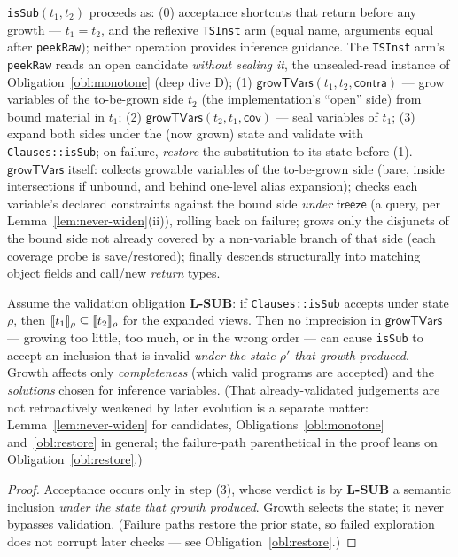 \documentclass[11pt]{article}
\begin{document}
\begin{definition}
\label{def:issub-arch}
\texttt{isSub}$(t_1, t_2)$ proceeds as:
(0) acceptance shortcuts that return before any growth --- $t_1 = t_2$, and
the reflexive \texttt{TSInst} arm (equal name, arguments equal after
\texttt{peekRaw}); neither operation provides inference guidance. The \texttt{TSInst} arm's
\texttt{peekRaw} reads an open candidate \emph{without sealing it},
the unsealed-read instance of
Obligation~\ref{obl:monotone} (deep dive D);
(1) $\mathsf{growTVars}(t_1, t_2, \mathsf{contra})$ — grow variables of the
to-be-grown side $t_2$ (the implementation's ``open'' side) from bound
material in $t_1$;
(2) $\mathsf{growTVars}(t_2, t_1, \mathsf{cov})$ — seal variables of $t_1$;
(3) expand both sides under the (now grown) state and validate with
\texttt{Clauses::isSub}; on failure, \emph{restore} the substitution to its
state before (1).
$\mathsf{growTVars}$ itself: collects growable variables of the
to-be-grown side
(bare, inside intersections if unbound, and behind one-level alias
expansion); checks each variable's declared constraints against the bound
side \emph{under} $\mathsf{freeze}$ (a query, per
Lemma~\ref{lem:never-widen}(ii)), rolling back on failure; grows only the
disjuncts of the bound side not already covered by a non-variable branch of
that side (each coverage probe is save/restored); finally descends
structurally into matching object fields and call/new \emph{return} types.
\end{definition}

\begin{theorem}
\label{thm:guidance}
Assume the validation obligation \textbf{L-SUB}: if
\texttt{Clauses::isSub} accepts under state $\rho$, then
$\llbracket t_1 \rrbracket_\rho \subseteq \llbracket t_2 \rrbracket_\rho$ for the expanded views. Then no
imprecision in $\mathsf{growTVars}$ — growing too little, too much, or in
the wrong order — can cause \texttt{isSub} to accept an inclusion that is
invalid \emph{under the state $\rho'$ that growth produced}. Growth affects
only \emph{completeness} (which valid programs are accepted) and the
\emph{solutions} chosen for inference variables. (That already-validated
judgements are not retroactively weakened by later evolution is a separate
matter: Lemma~\ref{lem:never-widen} for candidates,
Obligations~\ref{obl:monotone} and~\ref{obl:restore} in general; the
failure-path parenthetical in the proof leans on
Obligation~\ref{obl:restore}.)
\end{theorem}
\begin{proof}
Acceptance occurs only in step (3), whose verdict is by \textbf{L-SUB} a
semantic inclusion \emph{under the state that growth produced}. Growth
selects the state; it never bypasses validation. (Failure paths restore the
prior state, so failed exploration does not corrupt later checks — see
Obligation~\ref{obl:restore}.)
\end{proof}
\end{document}
